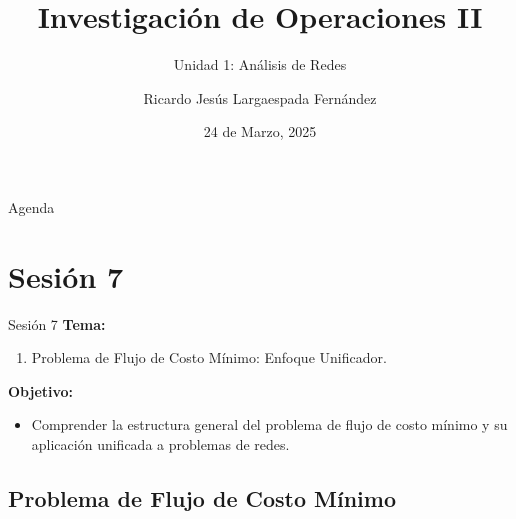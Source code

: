 \documentclass{beamer}
\title{Investigación de Operaciones II}
\subtitle{Unidad 1: Análisis de Redes}
\author{Ricardo Jesús Largaespada Fernández}
\institute{Ingeniería de Sistemas, DACTIC, UNI}
\date{24 de Marzo, 2025}
\begin{document}
\frame{\titlepage}

\begin{frame}{Agenda}
    \tableofcontents
\end{frame}

\section{Sesión 7}

\begin{frame}{Sesión 7}
\textbf{Tema:}
\begin{enumerate}
    \item Problema de Flujo de Costo Mínimo: Enfoque Unificador.
\end{enumerate}

\textbf{Objetivo:}
\begin{itemize}
    \item Comprender la estructura general del problema de flujo de costo mínimo y su aplicación unificada a problemas de redes.
\end{itemize}
\end{frame}

\subsection{Problema de Flujo de Costo Mínimo}
\end{document}
